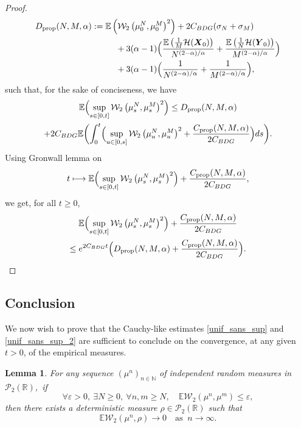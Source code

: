 \documentclass[JEP,XML,SOM,Unicode,published]{cedram}
\newcommand\mto{\mathchoice{\longmapsto}{\mapsto}{\mapsto}{\mapsto}}
\let\epsilon\varepsilon
\newcommand{\bX}{{\boldsymbol{X}}}
\newcommand{\bY}{{\boldsymbol{Y}}}
\theoremstyle{plain}
\newtheorem{lemma}{Lemma}[section]
\theoremstyle{definition}
\begin{document}
\begin{proof}
\begin{align*}
D_{\text{prop}}(N,M,\alpha)&:=\mathbb{E}\left(\mathcal{W}_2\left(\mu_0^N,\mu_0^M\right)^2\right)+2C_{BDG}(\sigma_N+\sigma_M)\\
&\hspace*{1cm}+3(\alpha-1)\Bigl(\frac{\mathbb{E}\left(\frac{1}{M}\mathcal{H}(\bX_0)\right)}{N^{(2-\alpha)/\alpha}}+\frac{\mathbb{E}\left(\frac{1}{N}\mathcal{H}(\bY_0)\right)}{M^{(2-\alpha)/\alpha}}\Bigr)\\
&\hspace*{1cm}+3(\alpha-1)\Bigl(\frac{1}{N^{(2-\alpha)/\alpha}}+\frac{1}{M^{(2-\alpha)/\alpha}}\Bigr),
\end{align*}
such that, for the sake of conciseness, we have
\begin{multline*}
\mathbb{E}\Bigl(\sup_{s\in[0,t]}\mathcal{W}_2\left(\mu_s^N,\mu_s^M\right)^2\Bigr)\leq D_{\text{prop}}(N,M,\alpha)\\
+2C_{BDG}\mathbb{E}\biggl(\int_0^t\Bigl(\sup_{u\in[0,s]}\mathcal{W}_2\left(\mu_u^N,\mu_u^M\right)^2+\frac{C_{\text{prop}}(N,M,\alpha)}{2C_{BDG}}\Bigr)ds\biggr).
\end{multline*}
Using Gronwall lemma on
\[
t\mto\mathbb{E}\Bigl(\sup_{s\in[0,t]}\mathcal{W}_2\left(\mu_s^N,\mu_s^M\right)^2\Bigr)+\frac{C_{\text{prop}}(N,M,\alpha)}{2C_{BDG}},
\]
we get, for all $t\geq0$,
\begin{multline*}
\mathbb{E}\Bigl(\sup_{s\in[0,t]}\mathcal{W}_2\left(\mu_s^N,\mu_s^M\right)^2\Bigr)+\frac{C_{\text{prop}}(N,M,\alpha)}{2C_{BDG}}\\
\leq e^{2C_{BDG}t}\Bigl(D_{\text{prop}}(N,M,\alpha)+\frac{C_{\text{prop}}(N,M,\alpha)}{2C_{BDG}}\Bigr).\qedhere
\end{multline*}
\end{proof}

\subsection{Conclusion}

We now wish to prove that the Cauchy-like estimates \eqref{unif_sans_sup} and \eqref{unif_sans_sup_2} are sufficient to conclude on the convergence, at any given $t>0$, of the empirical measures.

\begin{lemma}\label{conv_a_t_fixe}
For any sequence $(\mu^n)_{n\in\mathbb{N}}$ of independent random measures in $\mathcal{P}_2\left(\mathbb{R}\right)$,~if
\begin{equation}\label{Cauchy_seq_point}
\forall \epsilon>0,\ \exists N\geq0,\ \forall n,m\geq N,\quad \mathbb{E}\mathcal{W}_2\left(\mu^n,\mu^m\right)\leq\epsilon,
\end{equation}
then there exists a deterministic measure $\rho\in\mathcal{P}_2\left(\mathbb{R}\right)$ such that
\[
\mathbb{E}\mathcal{W}_2\left(\mu^n,\rho\right)\to 0\quad\text{as }\ n\to\infty.
\]
\end{lemma}
\end{document}
